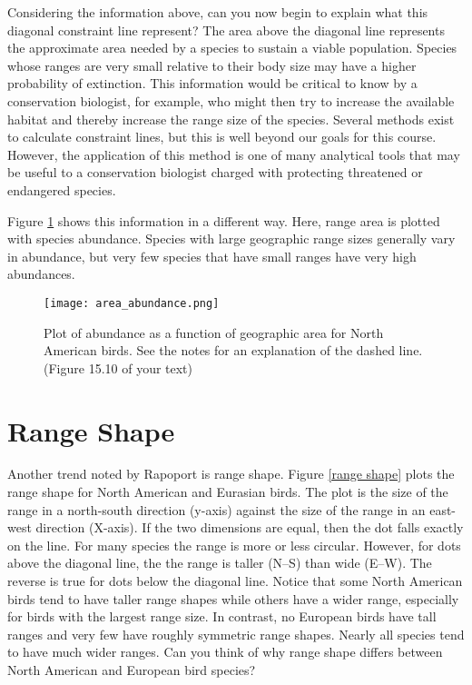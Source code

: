 \documentclass[12pt, oneside]{article}   	%
\begin{document}
Considering the information above, can you now begin to explain what this diagonal constraint line represent?  The area above the diagonal line represents the approximate area needed by a species to sustain a viable population.  Species whose ranges are very small relative to their body size may have a higher probability of extinction.  This information would be critical to know by a conservation biologist, for example, who might then try to increase the available habitat and thereby increase the range size of the species.  Several methods exist to calculate constraint lines, but this is well beyond our goals for this course.  However, the application of this method is one of many analytical tools that may be useful to a conservation biologist charged with protecting threatened or endangered species.

Figure \ref{area and abundance} shows this information in a different way.  Here, range area is plotted with species abundance.  Species with large geographic range sizes generally vary in abundance, but very few species that have small ranges have very high abundances.

\begin{figure}[tb]
	\centering
		\texttt{[image: area\_abundance.png]}  
		\caption{Plot of abundance as a function of geographic area for North American birds.  See the notes for an explanation of the dashed line. (Figure 15.10 of your text) \label{area and abundance}}
\end{figure}

\section{Range Shape}

Another trend noted by Rapoport is range shape.  Figure \ref{range shape} plots the range shape for North American and Eurasian birds.  The plot is the size of the range in a north-south direction (y-axis) against the size of the range in an east-west direction (X-axis). If the two dimensions are equal, then the dot falls exactly on the line.  For many species the range is more or less circular.  However, for dots above the diagonal line, the the range is taller (N--S) than wide (E--W).  The reverse is true for dots below the diagonal line.  Notice that some North American birds tend to have taller range shapes while others have a wider range, especially for birds with the largest range size.  In contrast, no European birds have tall ranges and very few have roughly symmetric range shapes. Nearly all species tend to have much wider ranges.  Can you think of why range shape differs between North American and European bird species?
\end{document}
